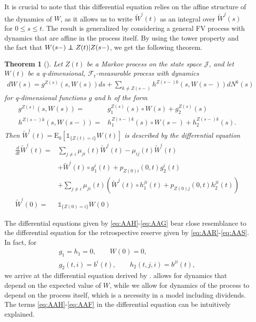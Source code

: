 \documentclass[12pt]{article}
\newcommand{\E}{\text{E}}
\newcommand{\indic}[1]{\mathds{1}_{ \{ #1 \} }}
\newcommand\independent{\protect\mathpalette{\protect\independenT}{\perp}}
\def\independenT#1#2{\mathrel{\rlap{$#1#2$}\mkern2mu{#1#2}}}
\theoremstyle{my_thm}
\newtheorem{thm}{Theorem}[section]
\begin{document}
It is crucial to note that this differential equation relies on the affine structure of the dynamics of $W$, as it allows us to write $\tilde{W}^i(t)$ as an integral over $\tilde{W}^j(s)$ for $0\leq s \leq t$. The result is generalized by considering a general FV process with dynamics that are affine in the process itself. By using the tower property and the fact that $W(s-)\independent Z(t)|Z(s-)$, we get the following theorem.
\begin{thm}[]
\label{thm:Diff_1}
Let $Z(t)$ be a Markov process on the state space $\mathcal{J}$, and let $W(t)$ be a q-dimensional, $\mathcal{F}_t$-measurable process with dynamics
\begin{align*}
dW(s)=  g^{Z(s)}(s,W(s))ds+
 \sum_{k \neq Z(s-)} h^{Z(s-)k}(s,W(s-)) dN^k(s) 
\end{align*}
for q-dimensional functions $g$ and $h$ of the form
\begin{align*}
g^{Z(s)}(s,W(s))=&g^{Z(s)}_1(s) \circ  W(s)+g_2^{Z(s)}(s)
\\
h^{Z(s-)k}(s,W(s-))=&h_1^{Z(s-)k}(s) \circ  W(s-)+h_2^{Z(s-)k}(s).
\end{align*}
Then $\tilde{W}^i(t)=\E_0[\indic{Z(t)=i}W(t)]$ is described by the differential equation
\begin{align}
\frac{d}{dt}\tilde{W}^i(t)=&
\sum_{j \neq i} \mu_{ji}(t) \tilde{W}^j(t)-\mu_{ij}(t)\tilde{W}^i(t)
 \label{eq:AAH} \\
&+
\tilde{W}^i(t) \circ g_1^i(t)+p_{Z(0)i}(0,t)g_2^i(t)
 \label{eq:AAI}\\
&+
\sum_{j\neq i} \mu_{ji}(t) \left( \tilde{W}^j(t) \circ  h_1^{ji}(t)+ p_{Z(0)j}(0,t)h_2^{ji}(t)\right) \label{eq:AAF}
\\
\tilde{W}^i(0)=&\indic{Z(0)=i}W(0) \label{eq:AAG}
\end{align}
\end{thm}
The differential equations given by \eqref{eq:AAH}-\eqref{eq:AAG} bear close resemblance to the differential equation for the retrospective reserve given by \eqref{eq:AAR}-\eqref{eq:AAS}. In fact, for
\begin{gather*}
g_1=h_1=0, \qquad W(0)=0,
\\
g_2(t,i)=b^{i}(t),\qquad h_2(t,j,i)=b^{ji}(t),
\end{gather*}
we arrive at the differential equation derived by \citet{Norberg}. \citet{Norberg} allows for dynamics that depend on the expected value of $W$, while we allow for dynamics of the process to depend on the process itself, which is a necessity in a model including dividends. The terms \eqref{eq:AAH}-\eqref{eq:AAF} in the differential equation can be intuitively explained.
\end{document}
